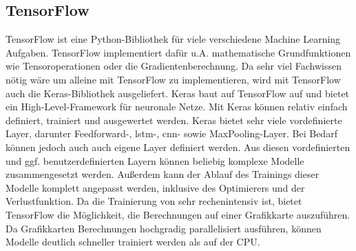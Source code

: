 \subsection{TensorFlow}
\label{sec:TensorFlow}

TensorFlow ist eine Python-Bibliothek für viele verschiedene Machine Learning Aufgaben.
TensorFlow implementiert dafür u.A. mathematische Grundfunktionen wie Tensoroperationen oder die Gradientenberechnung.
Da sehr viel Fachwissen nötig wäre um alleine mit TensorFlow  zu implementieren, wird mit TensorFlow auch die Keras-Bibliothek ausgeliefert.
Keras baut auf TensorFlow auf und bietet ein High-Level-Framework für neuronale Netze.
Mit Keras können  relativ einfach definiert, trainiert und ausgewertet werden.
Keras bietet sehr viele vordefinierte Layer, darunter Feedforward-, \acrshort{lstm}-, \acrshort{cnn}- sowie MaxPooling-Layer.
Bei Bedarf können jedoch auch auch eigene Layer definiert werden.
Aus diesen vordefinierten und ggf. benutzerdefinierten Layern können beliebig komplexe Modelle zusammengesetzt werden.
Außerdem kann der Ablauf des Trainings dieser Modelle komplett angepasst werden, inklusive des Optimierers und der Verlustfunktion.
Da die Trainierung von  sehr rechenintensiv ist, bietet TensorFlow die Möglichkeit, die Berechnungen auf einer Grafikkarte auszuführen.
Da Grafikkarten Berechnungen hochgradig parallelisiert ausführen, können Modelle deutlich schneller trainiert werden als auf der CPU.
